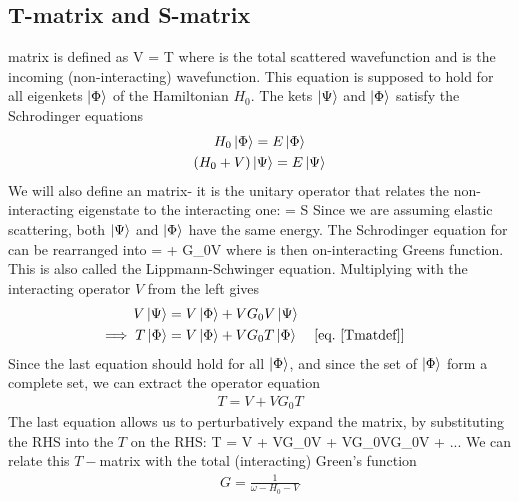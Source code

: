 \documentclass[12pt,twoside]{report}
\numberwithin{equation}{section}
\begin{document}
\subsection{T-matrix and S-matrix}
matrix is defined as\cite{sakurai}
\beq
\label{Tmatdef}
V\ket{\Psi} = T\ket{\Phi}
\eeq
where \il{\ket{\Psi}} is the total scattered wavefunction and \il{\ket{\Phi}} is the incoming (non-interacting) wavefunction. This equation is supposed to hold for all eigenkets \(\ket{\Phi}\) of the Hamiltonian \(H_0\). 
\pb The kets \(\ket{\Psi}\) and \(\ket{\Phi}\) satisfy the Schrodinger equations
\begin{gather}
	H_0 \ket{\Phi} = E \ket{\Phi}\\
(H_0 + V)\ket{\Psi} = E \ket{\Psi}
\end{gather}
We will also define an matrix- it is the unitary operator that relates the non-interacting eigenstate to the interacting one:
\beq
\label{Smatdef}
\ket{\Psi} = S\ket{\Phi}
\eeq
Since we are assuming elastic scattering, both \(\ket{\Psi}\) and \(\ket{\Phi}\) have the same energy.
The Schrodinger equation for \il{\ket{\Psi}} can be rearranged into
\beq[lse]
\ket{\Psi} = \ket{\Phi} + G_0V\ket{\Psi}
\eeq
where  is then on-interacting Greens function.
This is also called the Lippmann-Schwinger equation.
Multiplying with the interacting operator \(V\) from the left gives
\begin{equation}\begin{aligned}
	V\ket{\Psi} &= V\ket{\Phi} + VG_0V\ket{\Psi}\\
	\implies T\ket{\Phi} &= V\ket{\Phi} + VG_0 T\ket{\Phi} && \left[ \text{eq.~\ref{Tmatdef}} \right] 
\end{aligned}\end{equation}
Since the last equation should hold for all \(\ket{\Phi}\), and since the set of \(\ket{\Phi}\) form a complete set, we can extract the operator equation
\begin{equation}\begin{aligned}
	\label{TinG}
	T = V + V G_0 T
\end{aligned}\end{equation}
The last equation allows us to perturbatively expand the  matrix, by substituting the RHS into the \(T\) on the RHS:
\beq
T = V + VG_0V + VG_0VG_0V + ...
\label{tmatexp}
\eeq
We can relate this \(T-\)matrix with the total (interacting) Green's function
\begin{equation}\begin{aligned}
	G = \frac{1}{\omega - H_0 - V}
\end{aligned}\end{equation}
\end{document}
